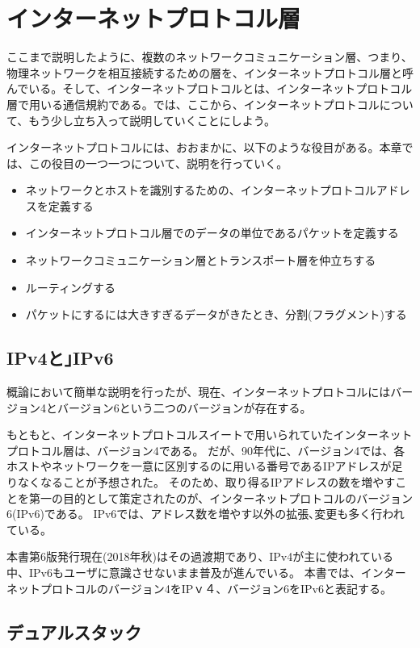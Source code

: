 \section{インターネットプロトコル層}

ここまで説明したように、複数のネットワークコミュニケーション層、つまり、物理ネットワークを相互接続するための層を、インターネットプロトコル層と呼んでいる。そして、インターネットプロトコルとは、インターネットプロトコル層で用いる通信規約である。では、ここから、インターネットプロトコルについて、もう少し立ち入って説明していくことにしよう。

インターネットプロトコルには、おおまかに、以下のような役目がある。本章では、この役目の一つ一つについて、説明を行っていく。

\begin{itemize}
\item ネットワークとホストを識別するための、インターネットプロトコルアドレスを定義する 
\item インターネットプロトコル層でのデータの単位であるパケットを定義する 
\item ネットワークコミュニケーション層とトランスポート層を仲立ちする 
\item ルーティングする
\item パケットにするには大きすぎるデータがきたとき、分割(フラグメント)する
\end{itemize}

\subsection{IPv4と｣IPv6}
概論において簡単な説明を行ったが、現在、インターネットプロトコルにはバージョン4とバージョン6という二つのバージョンが存在する。

もともと、インターネットプロトコルスイートで用いられていたインターネットプロトコル層は、バージョン4である。
だが、90年代に、バージョン4では、各ホストやネットワークを一意に区別するのに用いる番号であるIPアドレスが足りなくなることが予想された。
そのため、取り得るIPアドレスの数を増やすことを第一の目的として策定されたのが、インターネットプロトコルのバージョン6(IPv6)である。
IPv6では、アドレス数を増やす以外の拡張､変更も多く行われている。

本書第6版発行現在(2018年秋)はその過渡期であり、IPv4が主に使われている中、IPv6もユーザに意識させないまま普及が進んでいる。
本書では、インターネットプロトコルのバージョン4をIPｖ４、バージョン6をIPv6と表記する。

\subsection{デュアルスタック}


